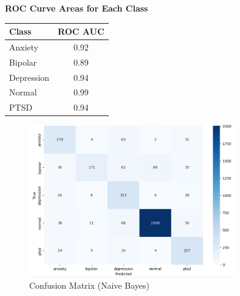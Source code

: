 \vspace{0.25em}

\begin{center}
    \textbf{ROC Curve Areas for Each Class} \\[0.5em]
    \begin{tabular}{|l|c|}
        \hline
        \textbf{Class}  & \textbf{ROC AUC} \\ \hline
        Anxiety         & 0.92            \\ \hline
        Bipolar         & 0.89            \\ \hline
        Depression      & 0.94            \\ \hline
        Normal          & 0.99            \\ \hline
        PTSD            & 0.94            \\ \hline
    \end{tabular}
\end{center}

\vspace{0.25em}

\begin{figure}[h!]  
    \centering
    \includegraphics[width=0.8\textwidth]{Images/NB Confusion Matrix.png}  
    \caption{Confusion Matrix (Naive Bayes)}
    \label{NBCM}  %
\end{figure}

